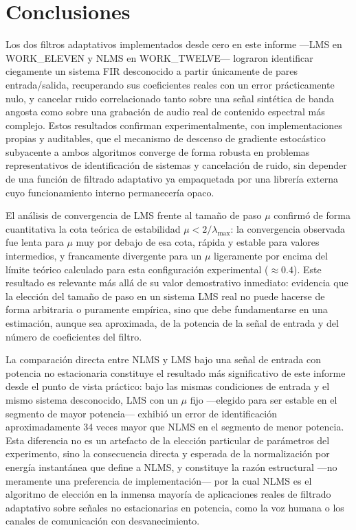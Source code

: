 \section{Conclusiones}
\label{sec:conclusiones}

Los dos filtros adaptativos implementados desde cero en este informe
—LMS en WORK\_ELEVEN y NLMS en WORK\_TWELVE— lograron identificar
ciegamente un sistema FIR desconocido a partir únicamente de pares
entrada/salida, recuperando sus coeficientes reales con un error
prácticamente nulo, y cancelar ruido correlacionado tanto sobre una
señal sintética de banda angosta como sobre una grabación de audio
real de contenido espectral más complejo. Estos resultados confirman
experimentalmente, con implementaciones propias y auditables, que el
mecanismo de descenso de gradiente estocástico subyacente a ambos
algoritmos converge de forma robusta en problemas representativos de
identificación de sistemas y cancelación de ruido, sin depender de una
función de filtrado adaptativo ya empaquetada por una librería externa
cuyo funcionamiento interno permanecería opaco.

El análisis de convergencia de LMS frente al tamaño de paso $\mu$
confirmó de forma cuantitativa la cota teórica de estabilidad
$\mu < 2/\lambda_{\max}$: la convergencia observada fue lenta para
$\mu$ muy por debajo de esa cota, rápida y estable para valores
intermedios, y francamente divergente para un $\mu$ ligeramente por
encima del límite teórico calculado para esta configuración
experimental ($\approx 0.4$). Este resultado es relevante más allá de
su valor demostrativo inmediato: evidencia que la elección del tamaño
de paso en un sistema LMS real no puede hacerse de forma arbitraria o
puramente empírica, sino que debe fundamentarse en una estimación,
aunque sea aproximada, de la potencia de la señal de entrada y del
número de coeficientes del filtro.

La comparación directa entre NLMS y LMS bajo una señal de entrada con
potencia no estacionaria constituye el resultado más significativo de
este informe desde el punto de vista práctico: bajo las mismas
condiciones de entrada y el mismo sistema desconocido, LMS con un
$\mu$ fijo —elegido para ser estable en el segmento de mayor
potencia— exhibió un error de identificación aproximadamente 34 veces
mayor que NLMS en el segmento de menor potencia. Esta diferencia no es
un artefacto de la elección particular de parámetros del experimento,
sino la consecuencia directa y esperada de la normalización por
energía instantánea que define a NLMS, y constituye la razón
estructural —no meramente una preferencia de implementación— por la
cual NLMS es el algoritmo de elección en la inmensa mayoría de
aplicaciones reales de filtrado adaptativo sobre señales no
estacionarias en potencia, como la voz humana o los canales de
comunicación con desvanecimiento.

